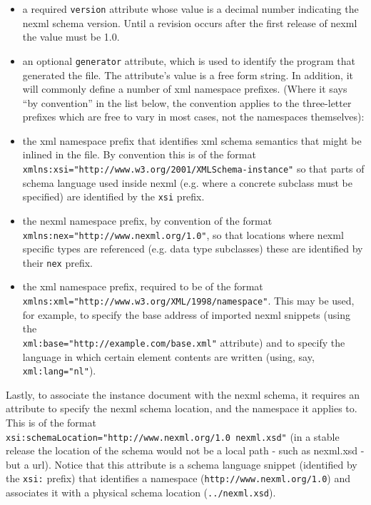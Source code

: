 \documentclass{article}
\newcommand{\code}{\texttt} \usepackage{fullpage}
\begin{document}
\begin{itemize}

\item a required \code{version} attribute whose value is a decimal
number indicating the nexml schema version. Until a revision occurs
after the first release of nexml the value must be 1.0.

\item an optional \code{generator} attribute, which is used to identify
the program that generated the file. The attribute's value is a free
form string. In addition, it will commonly define a number of xml
namespace prefixes. (Where it says ``by convention'' in the list below,
the convention applies to the three-letter prefixes which are free to
vary in most cases, not the namespaces themselves):

\item the xml namespace prefix that identifies xml schema semantics that
might be inlined in the file. By convention this is of the format \\
\code{xmlns:xsi="http://www.w3.org/2001/XMLSchema-instance"} so that
parts of schema language used inside nexml (e.g. where a concrete
subclass must be specified) are identified by the \code{xsi} prefix.

\item the nexml namespace prefix, by convention of the format \\
\code{xmlns:nex="http://www.nexml.org/1.0"}, so that  locations where
nexml specific types are referenced (e.g. data type subclasses) these
are identified by their \code{nex} prefix.

\item the xml namespace prefix, required to be of the format \\
\code{xmlns:xml="http://www.w3.org/XML/1998/namespace"}. This may be
used, for example, to specify the base address of imported nexml
snippets (using the \\ \code{xml:base="http://example.com/base.xml"}
attribute) and to specify the language in which certain element contents
are written (using, say, \code{xml:lang="nl"}).

\end{itemize}

Lastly, to associate the instance document with the nexml schema, it
requires an attribute to specify the nexml schema location, and the
namespace it applies to. This is of the format \\
\code{xsi:schemaLocation="http://www.nexml.org/1.0 nexml.xsd"} (in a
stable release the location of the schema would not be a local path -
such as nexml.xsd - but a url). Notice that this attribute is a schema
language snippet (identified by the \code{xsi:} prefix) that identifies
a namespace (\code{http://www.nexml.org/1.0}) and associates it with a
physical schema location (\code{../nexml.xsd}).
\end{document}
